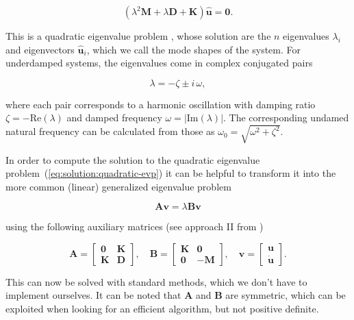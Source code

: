 \begin{equation}
\left(\lambda^2 \boldsymbol{M} + \lambda \boldsymbol{D} + \boldsymbol{K}\right)\hat{\boldsymbol{u}} = \boldsymbol{0}. \label{eq:solution:quadratic-evp}
\end{equation}

This is a quadratic eigenvalue problem \cite{bib:dw07}, whose solution are the $n$ eigenvalues $\lambda_{i}$ and eigenvectors $\hat{\boldsymbol{u}}_{i}$, which we call the mode shapes of the system.
For underdamped systems, the eigenvalues come in complex conjugated pairs

\begin{equation}
\lambda = -\zeta \pm i\,\omega,
\end{equation}

where each pair corresponds to a harmonic oscillation with damping ratio $\zeta = -\mathrm{Re}(\lambda)$ and damped frequency $\omega = |\mathrm{Im}(\lambda)|$.
The corresponding undamed natural frequency can be calculated from those as $\omega_{0} = \sqrt{\omega^2 + \zeta^2}$.

In order to compute the solution to the quadratic eigenvalue problem~(\ref{eq:solution:quadratic-evp}) it can be helpful to transform it into the more common (linear) generalized eigenvalue problem

\begin{equation}
\boldsymbol{A}\boldsymbol{v} = \lambda\boldsymbol{B}\boldsymbol{v}
\end{equation}

using the following auxiliary matrices (see approach II from \cite{bib:dw07})

\begin{equation}
\boldsymbol{A}
=
\begin{bmatrix}
\boldsymbol{0} & \boldsymbol{K} \\
\boldsymbol{K} & \boldsymbol{D}
\end{bmatrix},
\quad
\boldsymbol{B}
=
\begin{bmatrix}
\boldsymbol{K} & \boldsymbol{0} \\
\boldsymbol{0} & \boldsymbol{-M}
\end{bmatrix},
\quad
\boldsymbol{v}
=
\begin{bmatrix}
\boldsymbol{u} \\
\dot{\boldsymbol{u}}
\end{bmatrix}.
\end{equation}

This can now be solved with standard methods, which we don't have to implement ourselves.
It can be noted that $\boldsymbol{A}$ and $\boldsymbol{B}$ are symmetric, which can be exploited when looking for an efficient algorithm, but not positive definite.




